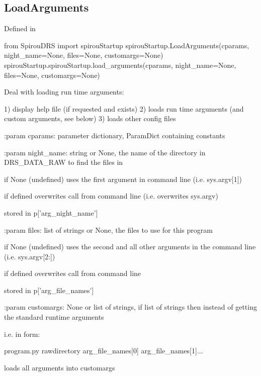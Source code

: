 \noindent\begin{minipage}{\textwidth}
\subsection{LoadArguments}

Defined in \spirouStartup{}

\begin{pythonbox}
from SpirouDRS import spirouStartup
spirouStartup.LoadArguments(cparams, night_name=None, files=None, customargs=None)
spirouStartup.spirouStartup.load_arguments(cparams, night_name=None, files=None, customargs=None)
\end{pythonbox}

\begin{pythondocstring}
Deal with loading run time arguments:

1) display help file (if requested and exists)
2) loads run time arguments (and custom arguments, see below)
3) loads other config files

:param cparams: parameter dictionary, ParamDict containing constants

:param night_name: string or None, the name of the directory in DRS_DATA_RAW
                   to find the files in

                   if None (undefined) uses the first argument in command
                   line (i.e. sys.argv[1])

                   if defined overwrites call from
                   command line (i.e. overwrites sys.argv)

                   stored in p['arg_night_name']

:param files: list of strings or None, the files to use for this program

              if None (undefined) uses the second and all other arguments in
              the command line (i.e. sys.argv[2:])

              if defined overwrites call from command line

              stored in p['arg_file_names']

:param customargs: None or list of strings, if list of strings then instead
                   of getting the standard runtime arguments

       i.e. in form:

            program.py rawdirectory arg_file_names[0] arg_file_names[1]...

       loads all arguments into customargs


\end{pythondocstring}
\end{minipage}
